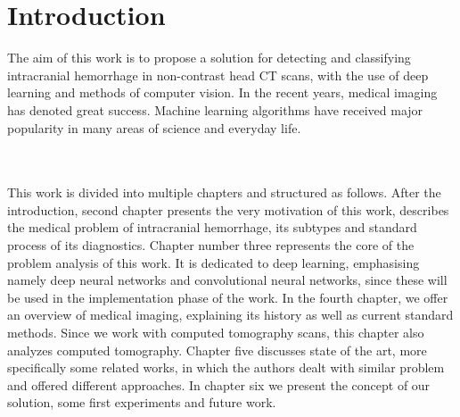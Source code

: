 \chapter{Introduction}

The aim of this work is to propose a solution for detecting and classifying intracranial hemorrhage in non-contrast head CT scans, with the use of deep learning and methods of computer vision. 
In the recent years, medical imaging has denoted great success. Machine learning algorithms have received major popularity in many areas of science and everyday life. 


\\\\This work is divided into multiple chapters and structured as follows. After the introduction, second chapter presents the very motivation of this work, describes the medical problem of intracranial hemorrhage, its subtypes and standard process of its diagnostics. Chapter number three represents the core of the problem analysis of this work. It is dedicated to deep learning, emphasising namely deep neural networks and convolutional neural networks, since these will be used in the implementation phase of the work. In the fourth chapter, we offer an overview of medical imaging, explaining its history as well as current standard methods. Since we work with computed tomography scans, this chapter also analyzes computed tomography. Chapter five discusses state of the art, more specifically some related works, in which the authors dealt with similar problem and offered different approaches. In chapter six we present the concept of our solution, some first experiments and future work.
